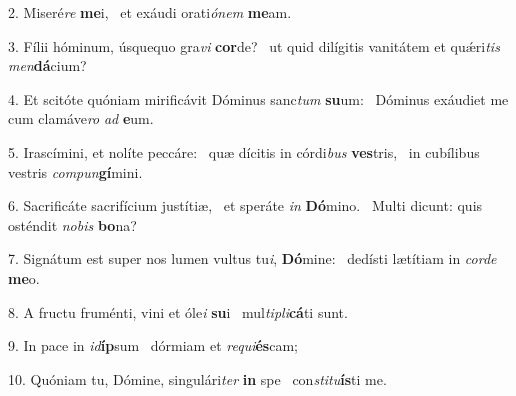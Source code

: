 2. Miseré\textit{re} \textbf{me}i, \ast\  et exáudi orati\textit{ó}\textit{nem} \textbf{me}am.\

3. Fílii hóminum, úsquequo gra\textit{vi} \textbf{cor}de? \ast\  ut quid dilígitis vanitátem et quǽri\textit{tis} \textit{men}\textbf{dá}cium?\

4. Et scitóte quóniam mirificávit Dóminus sanc\textit{tum} \textbf{su}um: \ast\  Dóminus exáudiet me cum clamáve\textit{ro} \textit{ad} \textbf{e}um.\

5. Irascímini, et nolíte peccáre: \dag\  quæ dícitis in córdi\textit{bus} \textbf{ves}tris, \ast\  in cubílibus vestris \textit{com}\textit{pun}\textbf{gí}mini.\

6. Sacrificáte sacrifícium justítiæ, \dag\  et speráte \textit{in} \textbf{Dó}mino. \ast\  Multi dicunt: quis osténdit \textit{no}\textit{bis} \textbf{bo}na?\

7. Signátum est super nos lumen vultus tu\textit{i}, \textbf{Dó}mine: \ast\  dedísti lætítiam in \textit{cor}\textit{de} \textbf{me}o.\

8. A fructu fruménti, vini et óle\textit{i} \textbf{su}i \ast\  mul\textit{ti}\textit{pli}\textbf{cá}ti sunt.\

9. In pace in \textit{id}\textbf{íp}sum \ast\  dórmiam et \textit{re}\textit{qui}\textbf{és}cam;\

10. Quóniam tu, Dómine, singulári\textit{ter} \textbf{in} spe \ast\  con\textit{sti}\textit{tu}\textbf{ís}ti me.\

